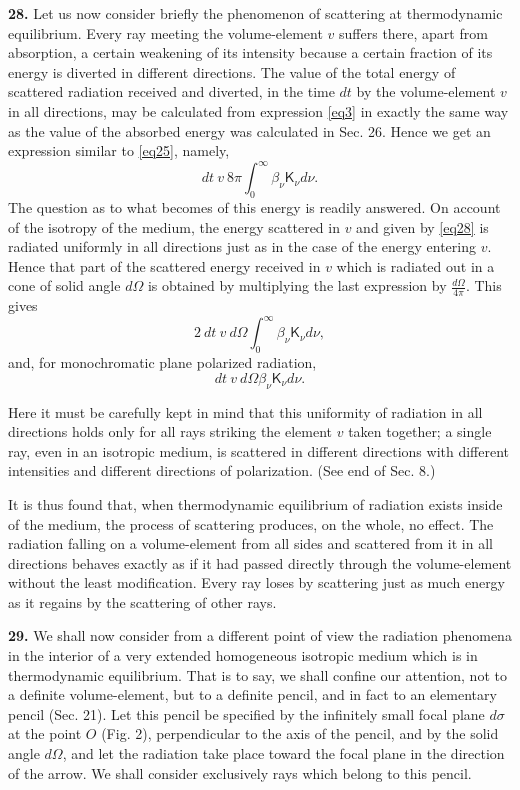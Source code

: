 \documentclass[12pt,oneside]{book}
\begin{document}
\textbf{28.} Let us now consider briefly the phenomenon of scattering at thermodynamic equilibrium. Every ray meeting the volume-element $v$ suffers there, apart from absorption, a certain weakening of its intensity because a certain fraction of its energy is diverted in different directions. The value of the total energy of scattered radiation received and diverted, in the time $dt$ by the volume-element $v$ in all directions, may be calculated from expression \eqref{eq3} in exactly the same way as the value of the absorbed energy was calculated in Sec. 26. Hence we get an expression similar to \eqref{eq25}, namely, 
\begin{equation}
    dt\ v\ 8\pi\int_0^\infty\beta_\nu\mathsf{K}_\nu d\nu.
    \label{eq28}
\end{equation}
The question as to what becomes of this energy is readily answered. On account of the isotropy of the medium, the energy scattered in $v$ and given by \eqref{eq28} is radiated uniformly in all directions just as in the case of the energy entering $v$. Hence that part of the scattered energy received in $v$ which is radiated out in a cone of solid angle $d\Omega$ is obtained by multiplying the last expression by $\frac{d\Omega}{4\pi}$. This gives 
$$2\ dt\ v\ d\Omega\int_0^\infty\beta_\nu\mathsf{K}_\nu d\nu,$$ 
and, for monochromatic plane polarized radiation, 
\begin{equation}
    dt\ v\ d\Omega\beta_\nu\mathsf{K}_\nu d\nu.
    \label{eq29}
\end{equation} \par 

Here it must be carefully kept in mind that this uniformity of radiation in all directions holds only for all rays striking the element $v$ taken together; a single ray, even in an isotropic medium, is scattered in different directions with different intensities and different directions of polarization. (See end of Sec. 8.) \par 

It is thus found that, when thermodynamic equilibrium of radiation exists inside of the medium, the process of scattering produces, on the whole, no effect. The radiation falling on a volume-element from all sides and scattered from it in all directions behaves exactly as if it had passed directly through the volume-element without the least modification. Every ray loses by scattering just as much energy as it regains by the scattering of other rays. \par 

\textbf{29.} We shall now consider from a different point of view the radiation phenomena in the interior of a very extended homogeneous isotropic medium which is in thermodynamic equilibrium. That is to say, we shall confine our attention, not to a definite volume-element, but to a definite pencil, and in fact to an elementary pencil (Sec. 21). Let this pencil be specified by the infinitely small focal plane $d\sigma$ at the point $O$ (Fig. 2), perpendicular to the axis of the pencil, and by the solid angle $d\Omega$, and let the radiation take place toward the focal plane in the direction of the arrow. We shall consider exclusively rays which belong to this pencil. \par 
\end{document}
